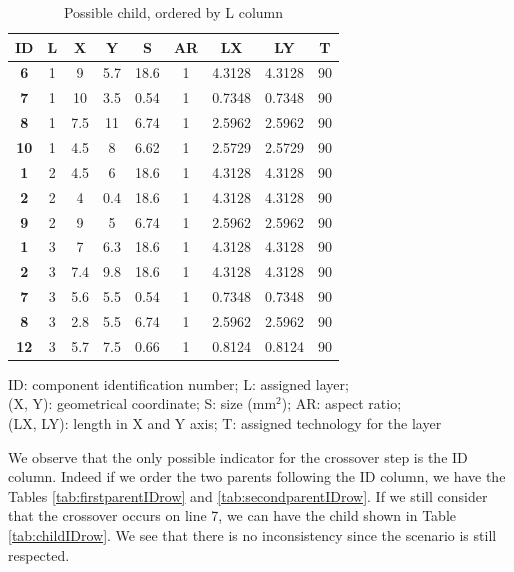 \begin{table}[h!]
\caption{Possible child, ordered by L column}
\begin{center}
\begin{scriptsize}
\begin{tabular}{|c|c|c|c|c|c|c|c|c|}
\hline ID & L & X & Y & S & AR & LX & LY & T\\
\hline \textbf{6} & 1 & 9 & 5.7 & 18.6 & 1 & 4.3128 & 4.3128 & 90\\
\textbf{7} & 1 & 10 & 3.5 & 0.54 & 1 & 0.7348 & 0.7348 & 90\\
\textbf{8} & 1 & 7.5 & 11 & 6.74 & 1 & 2.5962 & 2.5962 & 90\\
\textbf{10} & 1 & 4.5 & 8 & 6.62 & 1 & 2.5729 & 2.5729 & 90\\
\textbf{1} & 2 & 4.5 & 6 & 18.6 & 1 & 4.3128 & 4.3128 & 90\\
\textbf{2} & 2 & 4 & 0.4 & 18.6 & 1 & 4.3128 & 4.3128 & 90\\
\textbf{9} & 2 & 9 & 5 & 6.74 & 1 & 2.5962 & 2.5962 & 90\\
\textbf{1} & 3 & 7 & 6.3 & 18.6 & 1 & 4.3128 & 4.3128 & 90\\
\textbf{2} & 3 & 7.4 & 9.8 & 18.6 & 1 & 4.3128 & 4.3128 & 90\\
\textbf{7} & 3 & 5.6 & 5.5 & 0.54 & 1 & 0.7348 & 0.7348 & 90\\
\textbf{8} & 3 & 2.8 & 5.5 & 6.74 & 1 & 2.5962 & 2.5962 & 90\\
\textbf{12} & 3 & 5.7 & 7.5 & 0.66 & 1 & 0.8124 & 0.8124 & 90\\
\hline
\end{tabular}
\end{scriptsize}
\end{center}
\begin{center}
\begin{scriptsize}
ID: component identification number; L: assigned layer;\\
(X, Y): geometrical coordinate; S: size (mm$^2$); AR: aspect ratio;\\
(LX, LY): length in X and Y axis; T: assigned technology for the layer
\end{scriptsize}
\end{center}
\label{tab:childLrow}
\end{table}

We observe that the only possible indicator for the crossover step is the ID column. Indeed if we order the two parents following the ID column, we have the Tables \ref{tab:firstparentIDrow} and \ref{tab:secondparentIDrow}. If we still consider that the crossover occurs on line 7, we can have the child shown in Table \ref{tab:childIDrow}. We see that there is no inconsistency since the scenario is still respected.

